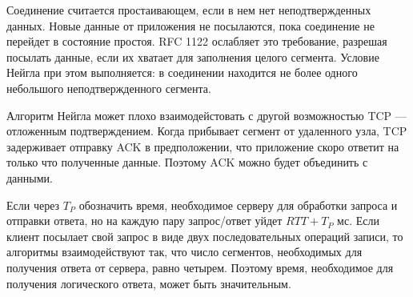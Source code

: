 Соединение считается простаивающем, если в нем нет неподтвержденных данных. Новые данные от приложения не посылаются, пока соединение не перейдет в состояние простоя. RFC 1122 ослабляет это требование, разрешая посылать данные, если их хватает для заполнения целого сегмента. Условие Нейгла при этом выполняется: в соединении находится не более одного небольшого неподтвержденного сегмента.

Алгоритм Нейгла может плохо взаимодейстовать с другой возможностью TCP --- отложенным подтверждением. Когда прибывает сегмент от удаленного узла, TCP задерживает отправку ACK в предположении, что приложение скоро ответит на только что полученные данные. Поэтому ACK можно будет объединить с данными.

Если через $T_P$ обозначить время, необходимое серверу для обработки запроса и отправки ответа, но на каждую пару запрос/ответ уйдет $RTT + T_P$ мс. Если клиент посылает свой запрос в виде двух последовательных операций записи, то алгоритмы взаимодействуют так, что число сегментов, необходимых для получения ответа от сервера, равно четырем. Поэтому время, необходимое для получения логического ответа, может быть значительным.
